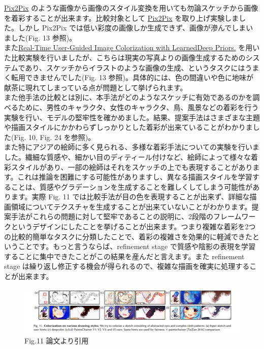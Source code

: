\documentclass[a4paper, dvipdfmx, 10pt]{article}
\begin{document}
\href{https://phillipi.github.io/pix2pix/}{Pix2Pix} のような画像から画像のスタイル変換を用いても勿論スケッチから画像を着彩することが出来ます。比較対象として \href{https://phillipi.github.io/pix2pix/}{Pix2Pix} を取り上げ実験しました。しかし Pix2Pix では低い彩度の画像しか生成できず、画像が滲んでしまいました(Fig. 13 参照)。\\

また\href{https://arxiv.org/pdf/1705.02999.pdf}{Real-Time User-Guided Image Colorization with LearnedDeep Priors.} を用いた比較実験を行いましたが、こちらは現実の写真よりの画像生成するためのシステムであり、スケッチからイラストのような画像の生成、というタスクにはうまく転用できませんでした(Fig. 13 参照)。具体的には、色の間違いや色に地味が献茶に現れてしまっている点が問題として挙げられます。\\

また他手法の比較とは別に、本手法がどのようなスケッチに有効であるのかを調べるために、男性のキャラクタ、女性のキャラクタ、鳥、風景などの着彩を行う実験を行い、モデルの堅牢性を確かめました。結果、提案手法はさまざまな主題や描画スタイルにかかわらずしっかりとした着彩が出来ていることがわかりました(Fig. 10, Fig. 24 を参照)。\\

また特にアジアの絵師に多く見られる、多様な着彩手法についての実験を行いました。繊細な質感や、細かい目のディティール付けなど、絵師によって様々な着彩スタイルがあり、一部の絵師はそれをスケッチの上でも表現することがあります。これは推論を困難にする可能性がありますし、異なる描画スタイルを学習することは、質感やグラデーションを生成することを難しくしてしまう可能性があります。実際 Fig. 11 では比較手法が目の色を表現することが出来ず、詳細な描画領域についてテクスチャを生成することが出来ていないことがわかります。提案手法がこれらの問題に対して堅牢であることの説明に、2段階のフレームワークというデザインにしたことを挙げることが出来ます。つまり複雑な着彩を2つの比較的簡単なタスクに分類したことで、着彩の複雑さを効果的に軽減できたということです。もっと言うならば、refinement stage で質感や陰影の表現を学習することに集中できたことがこの結果を産んだと言えます。また refinement stage は繰り返し修正する機会が得られるので、複雑な描画を確実に処理することが出来ます。\\
\begin{figure}[htbp]
\centering
\includegraphics[width=.9\linewidth]{./img/s2p_fig11.PNG}
\caption{Fig.11 論文より引用}
\end{figure}
\end{document}
